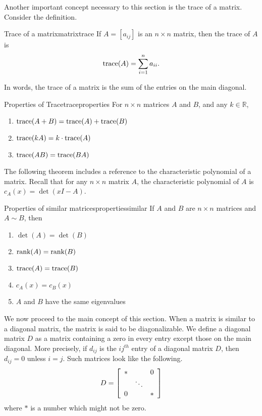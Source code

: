 Another important concept necessary to this section is the trace of a matrix. Consider the definition.

\begin{definition}{Trace of a matrix}{matrixtrace}
%
If $A=[a_{ij}]$ is an $n\times n$ matrix, then the
trace of $A$ is
\[ \mbox{trace}(A) = \sum_{i=1}^n a_{ii}.\]
\end{definition}

In words, the trace of a matrix is the sum of the entries on the main diagonal. 

\begin{lemma}{Properties of Trace}{traceproperties}
For $n\times n$ matrices $A$ and $B$, and any $k\in\mathbb{R}$,
\begin{enumerate}
\item $\mbox{trace}(A+B)=\mbox{trace}(A) + \mbox{trace}(B)$
\item $\mbox{trace}(kA)=k\cdot\mbox{trace}(A)$
\item $\mbox{trace}(AB)=\mbox{trace}(BA)$
\end{enumerate}
\end{lemma}

The following theorem includes a reference to the characteristic polynomial of a matrix. Recall that for any $n \times n$ matrix $A$, the characteristic polynomial of $A$ is $c_A(x)=\det(xI-A)$.

\begin{theorem}{Properties of similar matrices}{propertiessimilar}
If $A$ and $B$ are $n\times n$ matrices and $A\sim B$, then
\begin{enumerate}
\item $\det(A) = \det(B)$
\item $\mbox{rank}(A) = \mbox{rank}(B)$
\item $\mbox{trace}(A)= \mbox{trace}(B)$
\item $c_A(x)=c_B(x)$
\item $A$ and $B$ have the same eigenvalues
\end{enumerate}
\end{theorem}

We now proceed to the main concept of this section. When a matrix is similar to a diagonal matrix, the matrix is said to
be
diagonalizable. 
We define a diagonal matrix $D$ as a matrix containing a zero in every entry 
except those on the main diagonal. More precisely, if $d_{ij}$ is the $ij^{th}$ entry of a diagonal matrix $D$, then
$d_{ij}=0$ unless $i=j$. Such
matrices look like the following.
\begin{equation*}
D = \left[
\begin{array}{ccc}
\ast &  & 0 \\
& \ddots &  \\
0 &  & \ast
\end{array}
\right]
\end{equation*}
where $\ast $ is a number which might not be zero.

